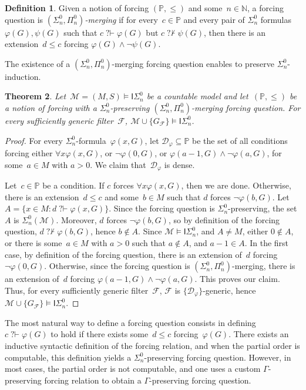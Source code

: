 \documentclass{article}
\def\NN{\mathbb{N}}
\def\PP{\mathbb{P}}
\def\F{\mathcal{F}}
\def\D{\mathcal{D}}
\def\M{\mathcal{M}}
\def\PP{\mathbb{P}}
\newcommand{\ISig}{\mathsf{I}\Sigma^0}
\newcommand{\qvdash}{\operatorname{{?}{\vdash}}}
\newcommand{\nqvdash}{\operatorname{{?}{\nvdash}}}
\newtheorem{theorem}{Theorem}
\numberwithin{theorem}{section}
\theoremstyle{definition}
\newtheorem{definition}[theorem]{Definition}
\begin{document}
\begin{definition}
Given a notion of forcing $(\PP, \leq)$ and some~$n \in \NN$, a forcing question is \emph{$(\Sigma^0_n, \Pi^0_n)$-merging}
if for every~$c \in \PP$ and every pair of $\Sigma^0_n$ formulas $\varphi(G), \psi(G)$ such that $c \qvdash \varphi(G)$ 
but $c \nqvdash \psi(G)$, then there is an extension~$d \leq c$ forcing $\varphi(G) \wedge \neg \psi(G)$.
\end{definition}

The existence of a $(\Sigma^0_n, \Pi^0_n)$-merging forcing question enables to preserve $\Sigma^0_n$-induction.

\begin{theorem}\label{thm:abstract-preservation-isig1}
Let~$\M = (M, S) \models \ISig_n$ be a countable model and let~$(\PP, \leq)$ be a notion of forcing with a $\Sigma^0_n$-preserving $(\Sigma^0_n,\Pi^0_n)$-merging forcing question. For every sufficiently generic filter~$\F$, $\M \cup \{G_\F\} \models \ISig_n$. 
\end{theorem}
\begin{proof}
For every $\Sigma^0_n$-formula~$\varphi(x, G)$, let $\D_\varphi \subseteq \PP$ be the set of all conditions forcing either $\forall x \varphi(x, G)$,
or $\neg \varphi(0, G)$, or $\varphi(a-1,G) \wedge \neg \varphi(a, G)$, for some~$a \in M$ with $a > 0$. We claim that~$\D_\varphi$ is dense.

Let~$c \in \PP$ be a condition. If $c$ forces $\forall x \varphi(x, G)$, then we are done. Otherwise, there is an extension~$d \leq c$ and some~$b \in M$ such that $d$ forces $\neg \varphi(b, G)$.
Let $A = \{ x \in M : d \qvdash \varphi(x, G) \}$.
Since the forcing question is $\Sigma^0_n$-preserving, the set $A$ is $\Sigma^0_n(\M)$.
Moreover, $d$ forces $\neg\varphi(b, G)$, so by definition of the forcing question, $d \nqvdash \varphi(b, G)$, hence $b \not \in A$.
Since $\M \models \ISig_n$, and $A \neq M$, either $0 \not \in A$, or there is some~$a \in M$ with $a > 0$ such that $a \not \in A$, and $a-1 \in A$.
In the first case, by definition of the forcing question, there is an extension of~$d$ forcing $\neg \varphi(0, G)$.
Otherwise, since the forcing question is $(\Sigma^0_n, \Pi^0_n)$-merging, there is an extension of~$d$
forcing $\varphi(a-1, G) \wedge \neg \varphi(a, G)$. This proves our claim.
Thus, for every sufficiently generic filter~$\F$, $\F$ is $\{\D_\varphi \}$-generic, hence $\M \cup \{G_\F\} \models \ISig_n$.
\end{proof}

The most natural way to define a forcing question consists in defining $c \qvdash \varphi(G)$ to hold if there exists some~$d \leq c$ forcing~$\varphi(G)$. There exists an inductive syntactic definition of the forcing relation, and when the partial order is computable, this definition yields a $\Sigma^0_n$-preserving forcing question. However, in most cases, the partial order is not computable, and one uses a custom $\Gamma$-preserving forcing relation to obtain a $\Gamma$-preserving forcing question.
\end{document}
